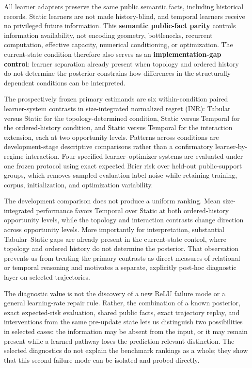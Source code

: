 \documentclass[11pt]{article}
\begin{document}
All learner adapters preserve the same public semantic facts, including historical records. Static learners are not made history-blind, and temporal learners receive no privileged future information. This \textbf{semantic public-fact parity} controls information availability, not encoding geometry, bottlenecks, recurrent computation, effective capacity, numerical conditioning, or optimization. The current-state condition therefore also serves as an \textbf{implementation-gap control}: learner separation already present when topology and ordered history do not determine the posterior constrains how differences in the structurally dependent conditions can be interpreted.

The prospectively frozen primary estimands are six within-condition paired learner-system contrasts in size-integrated normalized regret (INR): Tabular versus Static for the topology-determined condition, Static versus Temporal for the ordered-history condition, and Static versus Temporal for the interaction extension, each at two opportunity levels. Patterns across conditions are development-stage descriptive comparisons rather than a confirmatory learner-by-regime interaction. Four specified learner--optimizer systems are evaluated under one frozen protocol using exact expected Brier risk over held-out public-support groups, which removes sampled evaluation-label noise while retaining training, corpus, initialization, and optimization variability.

The development comparison does not produce a uniform ranking. Mean size-integrated performance favors Temporal over Static at both ordered-history opportunity levels, while the topology and interaction contrasts change direction across opportunity levels. More importantly for interpretation, substantial Tabular--Static gaps are already present in the current-state control, where topology and ordered history do not determine the posterior. That observation prevents us from treating the primary contrasts as direct measures of relational or temporal reasoning and motivates a separate, explicitly post-hoc diagnostic layer on selected trajectories.

The diagnostic value is not the discovery of a new ReLU failure mode or a general learning-rate repair rule. Rather, the combination of a known posterior, exact expected-risk evaluation, shared public facts, exact trajectory replay, and interventions from the same pre-update state lets us distinguish two possibilities in selected cases: the information may be absent from the input, or it may remain present while a learned pathway loses the prediction-relevant distinction. The selected diagnostics do not explain the benchmark rankings as a whole; they show that this second failure mode can be isolated and probed directly.
\end{document}
